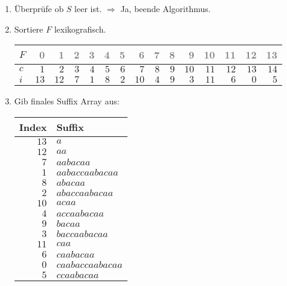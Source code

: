 \begin{enumerate}
\item 
Überprüfe ob $S$ leer ist.
$\Rightarrow$ Ja, beende Algorithmus.
\item 
Sortiere $F$ lexikografisch.
\begin{center}
\small\begin{tabular}{lrrrrrrrrrrrrrr}
    \toprule 
    $F$ & \textcolor{gray}{0} & \textcolor{gray}{1} & \textcolor{gray}{2} & \textcolor{gray}{3} & \textcolor{gray}{4} & \textcolor{gray}{5} & \textcolor{gray}{6} & \textcolor{gray}{7} & \textcolor{gray}{8} & \textcolor{gray}{9} & \textcolor{gray}{10} & \textcolor{gray}{11} & \textcolor{gray}{12} & \textcolor{gray}{13}\\
    \midrule 
    $c$ & $1$ & $2$ & $3$ & $4$ & $5$ & $6$ & $7$ & $8$ & $9$ & $10$ & $11$ & $12$ & $13$ & $14$ \\
    $i$ & $13$ & $12$ & $7$ & $1$ & $8$ & $2$ & $10$ & $4$ & $9$ & $3$ & $11$ & $6$ & $0$ & $5$ \\
    \bottomrule 
\end{tabular}
\end{center}

\item 
Gib finales Suffix Array aus:
\begin{center}
\small\begin{tabular}{rl}
\toprule 
 Index & Suffix \\
\midrule 
  $13$ & $a$ \\
  $12$ & $aa$ \\
  $ 7$ & $aabacaa$ \\
  $ 1$ & $aabaccaabacaa$ \\
  $ 8$ & $abacaa$ \\
  $ 2$ & $abaccaabacaa$ \\
  $10$ & $acaa$ \\
  $ 4$ & $accaabacaa$ \\
  $ 9$ & $bacaa$ \\
  $ 3$ & $baccaabacaa$ \\
  $11$ & $caa$ \\
  $ 6$ & $caabacaa$ \\
  $ 0$ & $caabaccaabacaa$ \\
  $ 5$ & $ccaabacaa$ \\
\bottomrule 
\end{tabular}\\
\end{center}
\end{enumerate}
